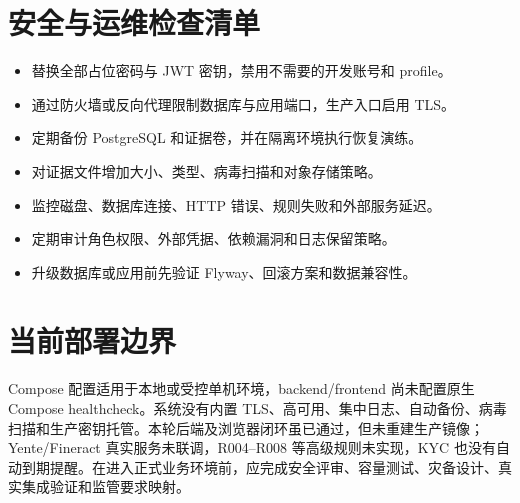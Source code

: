 \documentclass[UTF8,openany,zihao=-4]{ctexrep}
\begin{document}
\chapter{安全与运维检查清单}
\begin{itemize}
\item 替换全部占位密码与 JWT 密钥，禁用不需要的开发账号和 profile。
\item 通过防火墙或反向代理限制数据库与应用端口，生产入口启用 TLS。
\item 定期备份 PostgreSQL 和证据卷，并在隔离环境执行恢复演练。
\item 对证据文件增加大小、类型、病毒扫描和对象存储策略。
\item 监控磁盘、数据库连接、HTTP 错误、规则失败和外部服务延迟。
\item 定期审计角色权限、外部凭据、依赖漏洞和日志保留策略。
\item 升级数据库或应用前先验证 Flyway、回滚方案和数据兼容性。
\end{itemize}

\chapter{当前部署边界}
Compose 配置适用于本地或受控单机环境，backend/frontend 尚未配置原生 Compose healthcheck。系统没有内置 TLS、高可用、集中日志、自动备份、病毒扫描和生产密钥托管。本轮后端及浏览器闭环虽已通过，但未重建生产镜像；Yente/Fineract 真实服务未联调，R004--R008 等高级规则未实现，KYC 也没有自动到期提醒。在进入正式业务环境前，应完成安全评审、容量测试、灾备设计、真实集成验证和监管要求映射。
\end{document}
